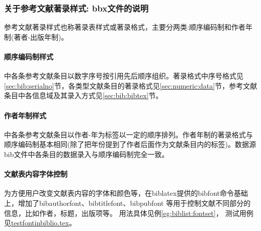 \subsubsection{关于参考文献著录样式: bbx文件的说明}\label{sec:usage:bbx}
参考文献著录样式也称著录表样式或著录格式，主要分两类:顺序编码制和作者年制(著者-出版年制)。

\paragraph{顺序编码制样式}中各条参考文献条目以数字序号按引用先后顺序组织。著录格式中序号格式见\ref{sec:bib:serialno}节，各类型文献条目的著录格式见\ref{sec:numeric:data}节，参考文献条目中各信息域及其录入方式见\ref{sec:bib:bibtex}节。

\paragraph{作者年制样式}中各条参考文献条目以作者-年为标签以一定的顺序排列。作者年制的著录格式与顺序编码制基本相同(除了把年份提到了作者后面作为文献条目内的标签)。数据源bib文件中各条目的数据录入与顺序编码制完全一致。



\paragraph{文献表内容字体控制} 为方便用户改变文献表内容的字体和颜色等，在biblatex提供的bibfont命令基础上，增加了bibauthorfont、bibtitlefont、bibpubfont 等用于控制文献不同部分的信息，比如作者，标题，出版项等。
用法具体见例\ref{eg:biblist:fontset}，
测试用例见\href{run:example/testfontinbiblio.tex}{testfontinbiblio.tex}。

